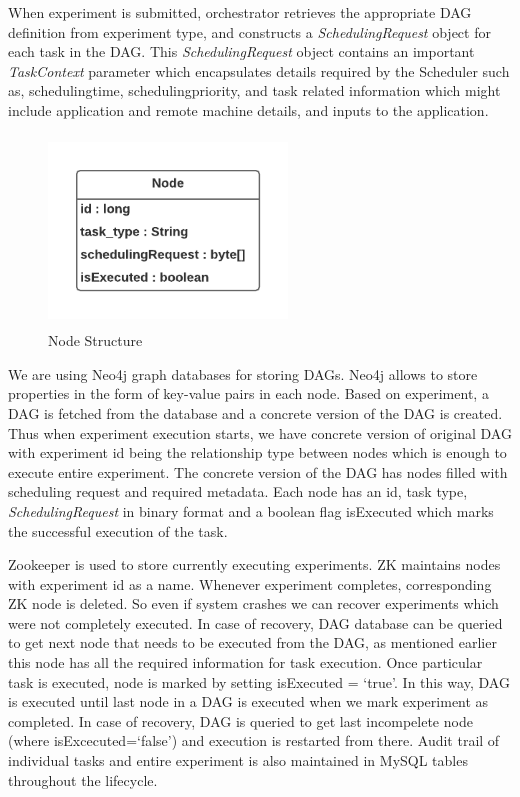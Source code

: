 \documentclass[sigconf]{acmart}
\begin{document}
When experiment is submitted, orchestrator retrieves the appropriate DAG definition from experiment type, and constructs a \textit{SchedulingRequest} object for each task in the DAG. This \textit{SchedulingRequest} object contains an important \textit{TaskContext} parameter which encapsulates details required by the Scheduler such as, scheduling\textunderscore time, scheduling\textunderscore priority, and task related information which might include application and remote machine details, and inputs to the application. \newline

\begin{figure}[t]
     \begin{minipage}[l]{1\columnwidth}
         \centering
         \includegraphics[height=2in, width=2.5in]{figures/node-structure.png}
         \caption{Node Structure}
     \end{minipage}\label{mage:node-structure}
     \hfill{}
 \end{figure}

We are using Neo4j graph databases for storing DAGs. Neo4j allows to store properties in the form of key-value pairs in each node. Based on experiment, a DAG is fetched from the database and a concrete version of the DAG is created. Thus when experiment execution starts, we have concrete version of original DAG with experiment id being the relationship type between nodes which is enough to execute entire experiment. The concrete version of the DAG has nodes filled with scheduling request and required metadata. Each node has an id, task type, \textit{SchedulingRequest} in binary format and a boolean flag isExecuted which marks the successful execution of the task. \newline

Zookeeper is used to store currently executing experiments. ZK maintains nodes with experiment id as a name. Whenever experiment completes, corresponding ZK node is deleted. So even if system crashes we can recover experiments which were not completely executed.
In case of recovery, DAG database can be queried to get next node that needs to be executed from the DAG, as mentioned earlier this node has all the required information for task execution. Once particular task is executed, node is marked by setting isExecuted = \lq true\rq. In this way, DAG is executed until last node in a DAG is executed when we mark experiment as completed. In case of recovery, DAG is queried to get last incompelete node (where isExcecuted=\lq false\rq) and execution is restarted from there. Audit trail of individual tasks and entire experiment is also maintained in MySQL tables throughout the lifecycle. \newline
\end{document}
